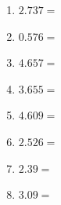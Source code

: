 \documentclass[12pt]{article}
\begin{document}
\begin{enumerate}
\item \large $ 2.737 = $ \vspace{1.5cm}
\item \large $ 0.576 = $ \vspace{1.5cm}
\item \large $ 4.657 = $ \vspace{1.5cm}
\item \large $ 3.655 = $ \vspace{1.5cm}
\item \large $ 4.609 = $ \vspace{1.5cm}
\item \large $ 2.526 = $ \vspace{1.5cm}
\item \large $ 2.39 = $ \vspace{1.5cm}
\item \large $ 3.09 = $ \vspace{1.5cm}
\end{enumerate}\newpage
\end{document}
